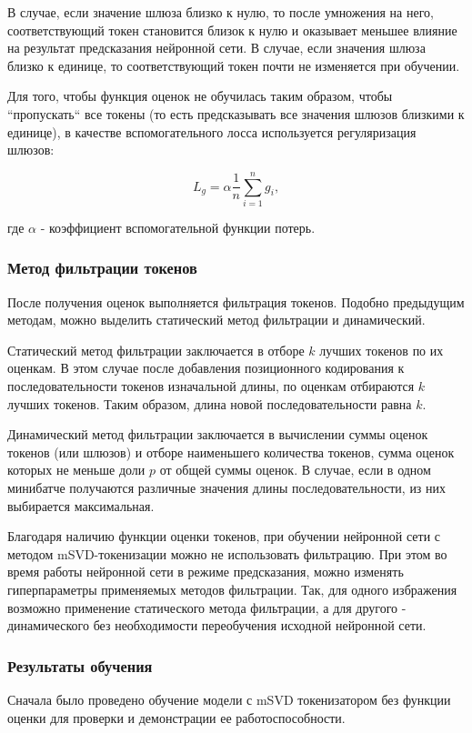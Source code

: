 В случае, если значение шлюза близко к нулю, то после умножения на него, соответствующий токен становится близок к нулю и оказывает меньшее влияние на результат предсказания нейронной сети. В случае, если значения шлюза близко к единице, то соответствующий токен почти не изменяется при обучении.

Для того, чтобы функция оценок не обучилась таким образом, чтобы ``пропускать`` все токены (то есть предсказывать все значения шлюзов близкими к единице), в качестве вспомогательного лосса используется регуляризация шлюзов:

$$
L_g = \alpha \dfrac{1}{n}\sum_{i=1}^n g_i,
$$

где $\alpha$ - коэффициент вспомогательной функции потерь.

\subsubsection{Метод фильтрации токенов}
После получения оценок выполняется фильтрация токенов. Подобно предыдущим методам, можно выделить статический метод фильтрации и динамический.

Статический метод фильтрации заключается в отборе $k$ лучших токенов по их оценкам. В этом случае после добавления позиционного кодирования к последовательности токенов изначальной длины, по оценкам отбираются $k$ лучших токенов. Таким образом, длина новой последовательности равна $k$.

Динамический метод фильтрации заключается в вычислении суммы оценок токенов (или шлюзов) и отборе наименьшего количества токенов, сумма оценок которых не меньше доли $p$ от общей суммы оценок. В случае, если в одном минибатче получаются различные значения длины последовательности, из них выбирается максимальная.

Благодаря наличию функции оценки токенов, при обучении нейронной сети с методом mSVD-токенизации можно не использовать фильтрацию. При этом во время работы нейронной сети в режиме предсказания, можно изменять гиперпараметры применяемых методов фильтрации. Так, для одного избражения возможно применение статического метода фильтрации, а для другого - динамического без необходимости переобучения исходной нейронной сети.


\subsubsection{Результаты обучения}

Сначала было проведено обучение модели с mSVD токенизатором без функции оценки для проверки и демонстрации ее работоспособности.


